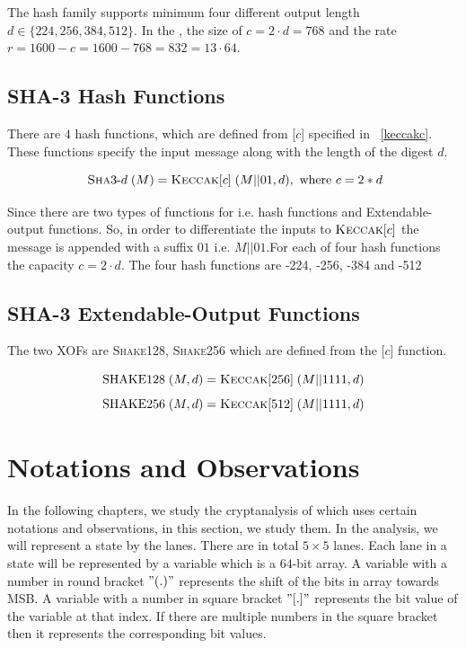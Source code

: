 The  hash family supports minimum four different output length $d \in \{224,256,384,512\}$. In the , the size of $c = 2\cdot d = 768$ and the rate $r = 1600 - c = 1600 - 768 = 832= 13\cdot 64$.

\subsection{SHA-3 Hash Functions}

There are $4$  hash functions, which are defined from \KECCAK{}[$c$] specified in ~\ref{keccakc}. These functions specify the input message along with the length of the digest $d$.

\[
   \text{ \textsc{Sha}3-}d\;(M) = \mbox{\textsc{Keccak}}{}[c]\;(M||01 , d), \text{ where } c = 2*d
\]

Since there are two types of functions for  i.e. hash functions and Extendable-output functions. So, in order to differentiate the inputs to $\mbox{\textsc{Keccak}}{}[c]$ the message is appended with a suffix $01$ i.e. $M||01$.For each of four hash functions the capacity $c = 2\cdot d$. The four hash functions are -224, -256, -384 and -512

\subsection{SHA-3 Extendable-Output Functions}

The two  XOFs are \textsc{Shake}128, \textsc{Shake}256 which are defined from the \KECCAK{}[$c$] function.

\[
    \text{SHAKE}128\;(M,d) = \mbox{\textsc{Keccak}}{}[256]\;(M||1111 , d)
\]
\[
    \text{SHAKE}256\;(M,d) = \mbox{\textsc{Keccak}}{}[512]\;(M||1111 , d)
\]

\section{Notations and Observations}

In the following chapters, we study the cryptanalysis of \KECCAK{} which uses certain notations and observations, in this section, we study them.
In the analysis, we will represent a state by the lanes. There are in total $5\times 5$ lanes. Each lane in a state will be represented by a variable which is a $64$-bit array. 
A variable with a number in round bracket $"( . )"$ represents the shift of the bits in array towards MSB. A variable with a number in square bracket $"[ . ]"$ represents the bit value of the variable at that index. If there are multiple numbers in the square bracket then it represents the corresponding bit values.

